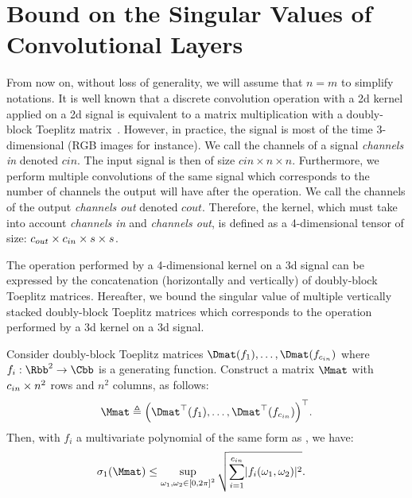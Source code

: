 \section{Bound on the Singular Values of Convolutional Layers}
\label{section:ch5-bound_on_the_singular_values_of_convolutional_layers}

From now on, without loss of generality, we will assume that $n=m$ to simplify notations.
It is well known that a discrete convolution operation with a 2d kernel applied on a 2d signal is equivalent to a matrix multiplication with a doubly-block Toeplitz matrix~\cite{jain1989fundamentals}.
However, in practice, the signal is most of the time 3-dimensional (RGB images for instance).
We call the channels of a signal \emph{channels in} denoted $cin$.
The input signal is then of size $cin \times n \times n$.
Furthermore, we perform multiple convolutions of the same signal which corresponds to the number of channels the output will have after the operation.
We call the channels of the output \emph{channels out} denoted $cout$.
Therefore, the kernel, which must take into account \emph{channels in} and \emph{channels out}, is defined as a 4-dimensional tensor of size: $c_{out} \times c_{in} \times s \times s$. 

The operation performed by a 4-dimensional kernel on a 3d signal can be expressed by the concatenation (horizontally and vertically) of doubly-block Toeplitz matrices.
Hereafter, we bound the singular value of multiple vertically stacked doubly-block Toeplitz matrices which corresponds to the operation performed by a 3d kernel on a 3d signal.

\begin{theorem} \label{theorem:bound_sv_stacked_dbt} 
  Consider doubly-block Toeplitz matrices $\Dmat(f_1), \dots, \Dmat(f_{\cin})$ where $f_i: \Rbb^2 \rightarrow \Cbb$ is a generating function.
  Construct a matrix $\Mmat$ with $c_{in}\times n^2$ rows and $n^2$ columns, as follows:
  \begin{equation}
    \Mmat \triangleq \leftmat \Dmat^\top(f_1), \dots, \Dmat^\top(f_{\cin}) \rightmat^\top .
  \end{equation}
  Then, with $f_i$ a multivariate polynomial of the same form as , we have:
  \begin{align} \label{equation:bound_asymptotic_equiv}
    \sigma_1 \left( \Mmat \right) &\leq \sup_{\omega_1, \omega_2 \in \left[0, 2\pi\right]^2} \sqrt{ \sum_{i=1}^{\cin} \left|f_i\right (\omega_1, \omega_2)|^2} .
  \end{align}
\end{theorem}

